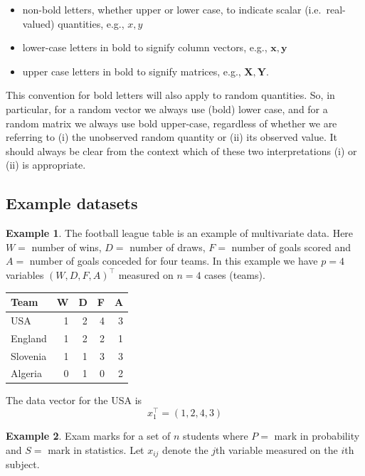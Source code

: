 \documentclass[
]{book}
\providecommand{\tightlist}{%
  \setlength{\itemsep}{0pt}\setlength{\parskip}{0pt}}
\theoremstyle{definition}
\theoremstyle{definition}
\newtheorem{example}{Example}[chapter]
\theoremstyle{definition}
\theoremstyle{definition}
\theoremstyle{remark}
\begin{document}
\begin{itemize}
\tightlist
\item
  non-bold letters, whether upper or lower case, to indicate scalar (i.e.~real-valued) quantities, e.g., \(x, y\)
\item
  lower-case letters in bold to signify column vectors, e.g., \(\mathbf x, \mathbf y\)
\item
  upper case letters in bold to signify matrices, e.g., \(\mathbf X, \mathbf Y\).
\end{itemize}

This convention for bold letters will also apply to random quantities. So, in particular, for a random vector we always use (bold) lower case, and for a random matrix we always use bold upper-case, regardless of whether we are referring to (i) the unobserved random quantity or (ii) its observed value. It should always be clear from the context which of these two interpretations (i) or (ii) is appropriate.

\subsection{Example datasets}\label{example-datasets}

\begin{example}
\protect\hypertarget{exm:football}{}\label{exm:football}The football league table is an example of multivariate data. Here \(W =\) number of wins, \(D =\) number of draws, \(F =\) number of goals scored and \(A =\) number of goals conceded for four teams.
In this example we have \(p=4\) variables \((W, D, F, A)^\top\) measured on \(n=4\) cases (teams).
\end{example}

\begin{table}
\centering
\begin{tabular}{lrrrr}
\toprule
Team & W & D & F & A\\
\midrule
USA & 1 & 2 & 4 & 3\\
England & 1 & 2 & 2 & 1\\
Slovenia & 1 & 1 & 3 & 3\\
Algeria & 0 & 1 & 0 & 2\\
\bottomrule
\end{tabular}
\end{table}

The data vector for the USA is
\[x_1^\top=(1,2,4,3)\]

\begin{example}
\protect\hypertarget{exm:exam}{}\label{exm:exam}Exam marks for a set of \(n\) students where \(P =\) mark in probability and \(S =\) mark in statistics.
Let \(x_{ij}\) denote the \(j\)th variable measured on the \(i\)th subject.
\end{example}
\end{document}
